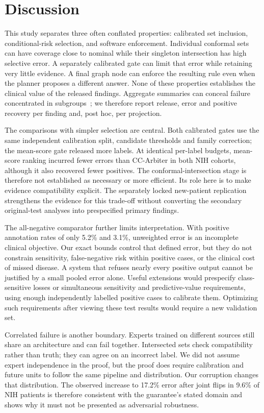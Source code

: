 \documentclass[10pt,a4paper]{article}
\begin{document}
\section{Discussion}
This study separates three often conflated properties: calibrated set inclusion, conditional-risk selection, and software enforcement. Individual conformal sets can have coverage close to nominal while their singleton intersection has high selective error. A separately calibrated gate can limit that error while retaining very little evidence. A final graph node can enforce the resulting rule even when the planner proposes a different answer. None of these properties establishes the clinical value of the released findings. Aggregate summaries can conceal failure concentrated in subgroups~\cite{oakdenrayner}; we therefore report release, error and positive recovery per finding and, post hoc, per projection.

The comparisons with simpler selection are central. Both calibrated gates use the same independent calibration split, candidate thresholds and family correction; the mean-score gate released more labels. At identical per-label budgets, mean-score ranking incurred fewer errors than CC-Arbiter in both NIH cohorts, although it also recovered fewer positives. The conformal-intersection stage is therefore not established as necessary or more efficient. Its role here is to make evidence compatibility explicit. The separately locked new-patient replication strengthens the evidence for this trade-off without converting the secondary original-test analyses into prespecified primary findings.

The all-negative comparator further limits interpretation. With positive annotation rates of only 5.2\% and 3.1\%, unweighted error is an incomplete clinical objective. Our exact bounds control that defined error, but they do not constrain sensitivity, false-negative risk within positive cases, or the clinical cost of missed disease. A system that refuses nearly every positive output cannot be justified by a small pooled error alone. Useful extensions would prespecify class-sensitive losses or simultaneous sensitivity and predictive-value requirements, using enough independently labelled positive cases to calibrate them. Optimizing such requirements after viewing these test results would require a new validation set.

Correlated failure is another boundary. Experts trained on different sources still share an architecture and can fail together. Intersected sets check compatibility rather than truth; they can agree on an incorrect label. We did not assume expert independence in the proof, but the proof does require calibration and future units to follow the same pipeline and distribution. Our corruption changes that distribution. The observed increase to 17.2\% error after joint flips in 9.6\% of NIH patients is therefore consistent with the guarantee's stated domain and shows why it must not be presented as adversarial robustness.
\end{document}
